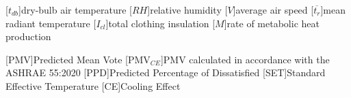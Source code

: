 
\renewcommand{\baselinestretch}{0.75}\normalsize
\renewcommand{\aclabelfont}[1]{\textsc{\acsfont{#1}}}
\begin{acronym}[longest]

    [$t_{db}$]{dry-bulb air temperature\acroextra{, \unit{\celsius}}}
    [$RH$]{relative humidity\acroextra{, \%}}
    [$V$]{average air speed}
    [$\overline{t_{r}}$]{mean radiant temperature\acroextra{, \unit{\celsius}}}
    [$I_{cl}$]{total clothing insulation}
    [$M$]{rate of metabolic heat production}

    [PMV]{Predicted Mean Vote}
    [PMV$_{CE}$]{PMV calculated in accordance with the ASHRAE 55:2020}
    [PPD]{Predicted Percentage of Dissatisfied\acroextra{, \%}}
    [SET]{Standard Effective Temperature\acroextra{, \unit{\celsius}}}
    [CE]{Cooling Effect\acroextra{, \unit{\celsius}}}

\end{acronym}
\renewcommand{\baselinestretch}{1}\normalsize